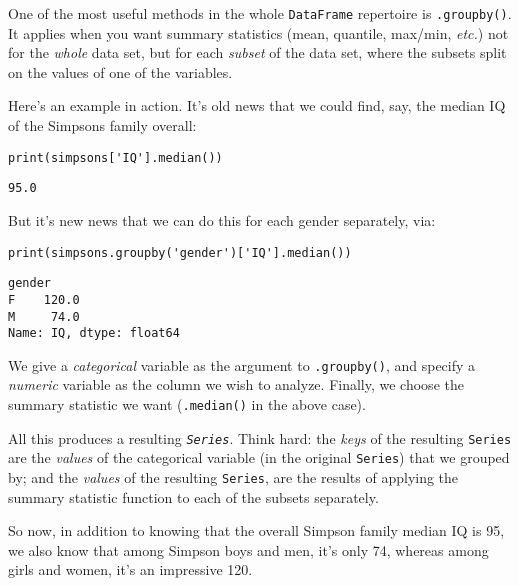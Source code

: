 One of the most useful methods in the whole \texttt{DataFrame} repertoire is
\texttt{.groupby()}. It applies when you want summary statistics (mean,
quantile, max/min, \textit{etc.}) not for the \textit{whole} data set, but for
each \textit{subset} of the data set, where the subsets split on the values of 
one of the variables.

Here's an example in action. It's old news that we could find, say, the median
IQ of the Simpsons family overall:

\begin{Verbatim}[fontsize=\small,samepage=true,frame=single,framesep=3mm]
print(simpsons['IQ'].median())
\end{Verbatim}
\vspace{-.2in}

\begin{Verbatim}[fontsize=\small,samepage=true,frame=leftline,framesep=5mm,framerule=1mm]
95.0
\end{Verbatim}

But it's new news that we can do this for each gender separately, via:

\begin{Verbatim}[fontsize=\normalsize,samepage=true,frame=single,framesep=3mm]
print(simpsons.groupby('gender')['IQ'].median())
\end{Verbatim}
\vspace{-.2in}

\begin{Verbatim}[fontsize=\small,samepage=true,frame=leftline,framesep=5mm,framerule=1mm]
gender
F    120.0
M     74.0
Name: IQ, dtype: float64
\end{Verbatim}

We give a \textit{categorical} variable as the argument to \texttt{.groupby()},
and specify a \textit{numeric} variable as the column we wish to analyze.
Finally, we choose the summary statistic we want (\texttt{.median()} in the
above case). 

All this produces a resulting \textit{\texttt{Series}}. Think hard: the
\textit{keys} of the resulting \texttt{Series} are the \textit{values} of the
categorical variable (in the original \texttt{Series}) that we grouped by; and
the \textit{values} of the resulting \texttt{Series}, are the results of
applying the summary statistic function to each of the subsets separately.

So now, in addition to knowing that the overall Simpson family median IQ is 95,
we also know that among Simpson boys and men, it's only 74, whereas among girls
and women, it's an impressive 120.

